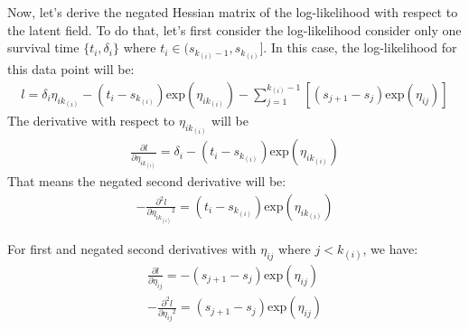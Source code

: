 \documentclass[]{article}
\begin{document}
Now, let's derive the negated Hessian matrix of the log-likelihood with
respect to the latent field. To do that, let's first consider the
log-likelihood consider only one survival time \(\{t_i,\delta_i\}\)
where \(t_i \in (s_{k_{(i)}-1},s_{k_{(i)}}]\). In this case, the
log-likelihood for this data point will be:
\begin{equation}\begin{aligned}\label{eqn:loglikeagain}
l = \delta_i \eta_{ik_{(i)}} - (t_i-s_{k_{(i)}})\text{exp}(\eta_{ik_{(i)}})-\sum_{j=1}^{k_{(i)}-1} [(s_{j+1}-s_j)\text{exp}(\eta_{ij})]
\end{aligned}\end{equation} The derivative with respect to
\(\eta_{ik_{(i)}}\) will be\\
\begin{equation}\begin{aligned}\label{eqn:hessian}
\frac{\partial l}{\partial \eta_{ik_{(i)}}}= \delta_i -(t_i-s_{k_{(i)}})\text{exp}(\eta_{ik_{(i)}})
\end{aligned}\end{equation} That means the negated second derivative
will be: \begin{equation}\begin{aligned}\label{eqn:hessian1}
-\frac{\partial^2 l}{\partial {\eta_{ik_{(i)}}}^2} = (t_i-s_{k_{(i)}})\text{exp}(\eta_{ik_{(i)}})
\end{aligned}\end{equation}

For first and negated second derivatives with \(\eta_{ij}\) where
\(j<k_{(i)}\), we have:
\begin{equation}\begin{aligned}\label{eqn:hessian2}
\frac{\partial l}{\partial \eta_{ij}}= -(s_{j+1}-s_j)\text{exp}(\eta_{ij})\\
-\frac{\partial^2 l}{\partial {\eta_{ij}}^2} = (s_{j+1}-s_j)\text{exp}(\eta_{ij})
\end{aligned}\end{equation}
\end{document}
